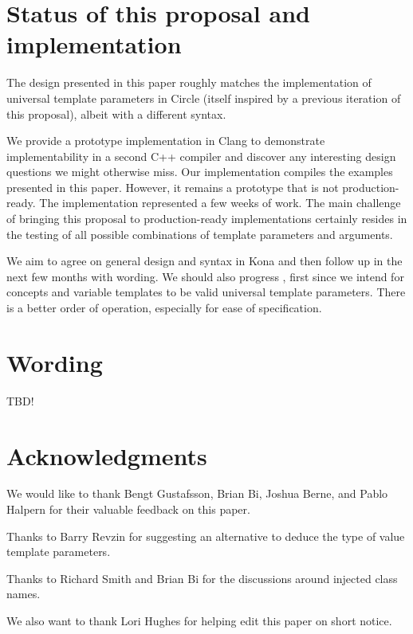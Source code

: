 \documentclass{wg21}
\begin{document}
\section{Status of this proposal and implementation}

The design presented in this paper roughly matches the implementation of universal template parameters in Circle (itself inspired by a previous iteration of this proposal),
albeit with a different syntax.

We provide a prototype implementation in Clang to demonstrate implementability in a second C++ compiler and discover any interesting design questions we might otherwise
miss. Our implementation compiles the examples presented in this paper. However, it remains a prototype that is not production-ready.
The implementation represented a few weeks of work. The main challenge of bringing this proposal to production-ready implementations certainly resides in the
testing of all possible combinations of template parameters and arguments.


We aim to agree on general design and syntax in Kona and then follow up in the next few months with wording.
We should also progress , first since we intend for concepts and variable templates to be valid universal template parameters.
There is a better order of operation, especially for ease of specification.

\section{Wording}

TBD!

\section{Acknowledgments}

We would like to thank Bengt Gustafsson, Brian Bi, Joshua Berne, and Pablo Halpern for their
valuable feedback on this paper.

Thanks to Barry Revzin for suggesting an alternative to deduce the type of value template parameters.

Thanks to Richard Smith and Brian Bi for the discussions around injected class names.


We also want to thank Lori Hughes for helping edit this paper on short notice.





\renewcommand{\section}[2]{}%

\begin{thebibliography}{9}


\end{thebibliography}
\end{document}
